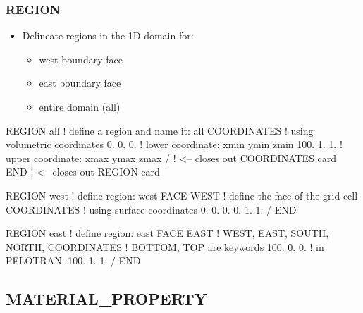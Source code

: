 \documentclass{beamer}
\newcommand\redcomment[1]{{{\color{red} #1}}}
\newcommand\bluecomment[1]{{{\color{blue} #1}}}
\newcommand\greencomment[1]{{{\color{green} #1}}}
\begin{document}
\begin{frame}\frametitle{REGION}

\vspace{1 cm}
\begin{itemize}
  \item Delineate regions in the 1D domain for:
  \begin{itemize}
    \item west boundary face
    \item east boundary face
    \item entire domain (all)
  \end{itemize}
\end{itemize}

\begin{semiverbatim}

REGION all            \bluecomment{! define a region and name it: \greencomment{all}}
  COORDINATES         \bluecomment{! using \redcomment{volumetric} coordinates}
    0. 0. 0.          \bluecomment{! lower coordinate: xmin ymin zmin}
    100. 1. 1.        \bluecomment{! upper coordinate: xmax ymax zmax}
  /   \bluecomment{! <-- closes out COORDINATES card}
END   \bluecomment{! <-- closes out REGION card}

\newpage
REGION west           \bluecomment{! define region:} \greencomment{west}
  FACE WEST           \bluecomment{! define the face of the grid cell}
  COORDINATES         \bluecomment{! using \redcomment{surface} coordinates}
    0. 0. 0.
    0. 1. 1.
  /
END

REGION east           \bluecomment{! define region:} \greencomment{east}
  FACE EAST           \redcomment{! WEST, EAST, SOUTH, NORTH,}
  COORDINATES         \redcomment{!   BOTTOM, TOP} \bluecomment{ are keywords}
    100. 0. 0.        \bluecomment{!   in PFLOTRAN.}
    100. 1. 1.
  /
END

\end{semiverbatim}

\end{frame}

\subsection{MATERIAL\_PROPERTY}
\end{document}
